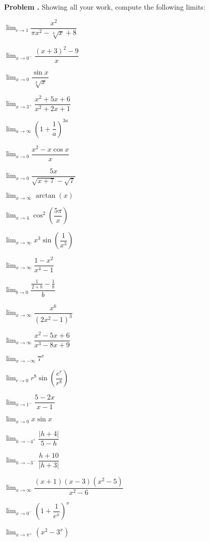 \documentclass[11pt,letterpaper]{article}
\newenvironment{2enumerate}{%
	\begin{enumerate}[(a)]
	\begin{multicols}{2}
	}{%
	\end{multicols}
	\end{enumerate}
}
\newcommand{\ds}{\displaystyle}
\newcounter{problem}
\newcommand{\prob}{\stepcounter{problem}%
\noindent\textbf{Problem \theproblem. }}
\begin{document}
\prob Showing all your work, compute the following limits:
	\begin{2enumerate}
	\item $\ds\lim_{c \to 1} \dfrac{x^2}{\pi x^2 - \sqrt[3]{x} + 8}$
	\item $\ds\lim_{x \to 0^-} \dfrac{(x + 3)^2 - 9}{x}$
	\item $\ds\lim_{x \to 0} \dfrac{\sin x}{\sqrt[3]{x}}$
	\item $\ds\lim_{x \to 3^+} \dfrac{x^2 + 5x + 6}{x^2 + 2x + 1}$
	\item $\ds\lim_{a \to \infty} \left(1 + \dfrac{1}{a} \right)^{3a}$
	\item $\ds\lim_{x \to 0} \dfrac{x^2 - x \cos x}{x}$
	\item $\ds\lim_{x \to 0} \dfrac{5x}{\sqrt{x + 7} - \sqrt{7}}$
	\item $\ds\lim_{x \to \infty} \arctan(x)$
	\item $\ds\lim_{x \to 4} \cos^2 \left( \dfrac{5\pi}{x} \right)$
	\item $\ds\lim_{x \to \infty} x^3 \sin \left( \dfrac{1}{x^3} \right)$
	\item $\ds\lim_{x \to \infty} \dfrac{1 - x^2}{x^4 - 1}$
	\item $\ds\lim_{b \to 0} \dfrac{\frac{1}{2 + b} - \frac{1}{b}}{b}$
	\item $\ds\lim_{x \to \infty} \dfrac{x^6}{(2x^2 - 1)^3}$
	\item $\ds\lim_{x \to \infty} \dfrac{x^2 - 5x + 6}{x^3 - 8x + 9}$
	\item $\ds\lim_{x \to -\infty} 7^x$
	\item $\ds\lim_{r \to 0} r^8 \sin \left( \dfrac{e^r}{r^8} \right)$
	\item $\ds\lim_{x \to 1^-} \dfrac{5 - 2x}{x - 1}$
	\item $\ds\lim_{x \to 0} x \sin x$
	\item $\ds\lim_{h \to -4^+} \dfrac{|h + 4|}{5 - h}$
	\item $\ds\lim_{h \to -3^-} \dfrac{h + 10}{|h + 3|}$
	\item $\ds\lim_{x \to \infty} \dfrac{(x + 1)(x - 3)(x^2 - 5)}{x^2 - 6}$
	\item $\ds\lim_{x \to 0^-} \left(1 + \dfrac{1}{e^x} \right)^x$ 
	\item $\ds\lim_{x \to \pi^+} \left( x^2 - 3^x \right)$
	\end{2enumerate}
\end{document}
